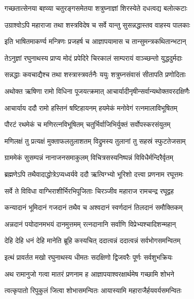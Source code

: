 \twolineshloka
{गच्छतात्सेनया बह्व्या चतुरङ्गसमेतया}
{शत्रुघ्नाज्ञां शिरस्येते दधत्वद्य बलोत्कटाः}%

\twolineshloka
{उग्राश्वोऽपि महाराजा तथा शस्त्रविदेष च}
{सर्वे यान्तु सुसन्नद्धास्तव वाहस्य पालकाः}%

\twolineshloka
{इति भाषितमाकर्ण्य मन्त्रिणः प्रजहर्ष च}
{आज्ञापयामास च तान्सुमन्त्रकथितान्भटान्}%

\twolineshloka
{तेऽनुज्ञां रघुनाथस्य प्राप्य मोदं प्रपेदिरे}
{चिरकालं साम्परायं वाञ्च्छन्तो युद्धदुर्मदाः}%

\twolineshloka
{सन्नद्धाः कवचाद्यैश्च तथा शस्त्रास्त्रवर्तनैः}
{ययुः शत्रुघ्नसंवासं सीतापति प्रणोदिताः}%


\twolineshloka
{अथोक्त ऋषिणा रामो विधिना पूजयत्क्रमात्}
{आचार्यादीनृषीन्सर्वान्यथोक्तवरदक्षिणैः}%

\twolineshloka
{आचार्याय ददौ रामो हस्तिनं षष्टिहायनम्}
{हयमेकं मनोवेगं रत्नमालाविभूषितम्}%

\twolineshloka
{पौरटं रथमेकं च मणिरत्नविभूषितम्}
{चतुर्भिर्वाजिभिर्युक्तं सर्वोपस्करसंयुतम्}%

\twolineshloka
{मणिलक्षं तु प्रत्यक्षं मुक्ताफलतुलाशतम्}
{विद्रुमस्य तुलानां तु सहस्रं स्फुटतेजसाम्}%

\twolineshloka
{ग्राममेकं सुसम्पन्नं नानाजनसमाकुलम्}
{विचित्रसस्यनिष्पन्नं विविधैर्मन्दिरैर्वृतम्}%

\twolineshloka
{ब्रह्मणेऽपि तथैवादाद्धोत्रेऽप्यध्वर्यवे ददौ}
{ऋत्विग्भ्यो भूरिशो दत्त्वा प्रणनाम रघूत्तमः}%

\twolineshloka
{सर्वे ते विविधा वाग्भिराशीर्भिरभिपूजिताः}
{चिरञ्जीव महाराज रामचन्द्र रघूद्वह}%

\twolineshloka
{कन्यादानं भूमिदानं गजदानं तथैव च}
{अश्वदानं स्वर्णदानं तिलदानं समौक्तिकम्}%

\twolineshloka
{अन्नदानं पयोदानमभयं दानमुत्तमम्}
{रत्नदानानि सर्वाणि विप्रेभ्यश्चादिशन्महान्}%

\twolineshloka
{देहि देहि धनं देहि मानेति ब्रूहि कस्यचित्}
{ददात्वन्नं ददात्वन्नं सर्वभोगसमन्वितम्}%

\twolineshloka
{इत्थं प्रावर्तत मखो रघुनाथस्य धीमतः}
{सदक्षिणो द्विजवरैः पूर्णः सर्वशुभक्रियः}%

\twolineshloka
{अथ रामानुजो गत्वा मातरं प्रणनाम ह}
{आज्ञापयाश्वरक्षार्थमेष गच्छामि शोभने}%

\twolineshloka
{त्वत्कृपातो रिपुकुलं जित्वा शोभासमन्वितः}
{आयास्यामि महाराजैर्हयवर्यसमन्वितः}%

